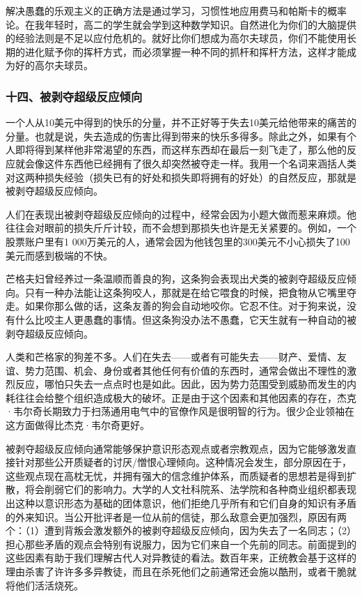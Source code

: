 解决愚蠢的乐观主义的正确方法是通过学习，习惯性地应用费马和帕斯卡的概率论。在我年轻时，高二的学生就会学到这种数学知识。自然进化为你们的大脑提供的经验法则是不足以应付危机的。就好比你们想成为高尔夫球员，你们不能使用长期的进化赋予你的挥杆方式，而必须掌握一种不同的抓杆和挥杆方法，这样才能成为好的高尔夫球员。
\par

\subsubsection*{十四、被剥夺超级反应倾向}

一个人从10美元中得到的快乐的分量，并不正好等于失去10美元给他带来的痛苦的分量。也就是说，失去造成的伤害比得到带来的快乐多得多。除此之外，如果有个人即将得到某样他非常渴望的东西，而这样东西却在最后一刻飞走了，那么他的反应就会像这件东西他已经拥有了很久却突然被夺走一样。我用一个名词来涵括人类对这两种损失经验（损失已有的好处和损失即将拥有的好处）的自然反应，那就是被剥夺超级反应倾向。
\par

人们在表现出被剥夺超级反应倾向的过程中，经常会因为小题大做而惹来麻烦。他往往会对眼前的损失斤斤计较，而不会想到那损失也许是无关紧要的。例如，一个股票账户里有1 000万美元的人，通常会因为他钱包里的300美元不小心损失了100美元而感到极端的不快。
\par

芒格夫妇曾经养过一条温顺而善良的狗，这条狗会表现出犬类的被剥夺超级反应倾向。只有一种办法能让这条狗咬人，那就是在给它喂食的时候，把食物从它嘴里夺走。如果你那么做的话，这条友善的狗会自动地咬你。它忍不住。对于狗来说，没有什么比咬主人更愚蠢的事情。但这条狗没办法不愚蠢，它天生就有一种自动的被剥夺超级反应倾向。
\par

人类和芒格家的狗差不多。人们在失去——或者有可能失去——财产、爱情、友谊、势力范围、机会、身份或者其他任何有价值的东西时，通常会做出不理性的激烈反应，哪怕只失去一点点时也是如此。因此，因为势力范围受到威胁而发生的内耗往往会给整个组织造成极大的破坏。正是由于这个因素和其他因素的存在，杰克·韦尔奇长期致力于扫荡通用电气中的官僚作风是很明智的行为。很少企业领袖在这方面做得比杰克·韦尔奇更好。
\par

被剥夺超级反应倾向通常能够保护意识形态观点或者宗教观点，因为它能够激发直接针对那些公开质疑者的讨厌/憎恨心理倾向。这种情况会发生，部分原因在于，这些观点现在高枕无忧，并拥有强大的信念维护体系，而质疑者的思想若是得到扩散，将会削弱它们的影响力。大学的人文社科院系、法学院和各种商业组织都表现出这种以意识形态为基础的团体意识，他们拒绝几乎所有和它们自身的知识有矛盾的外来知识。当公开批评者是一位从前的信徒，那么敌意会更加强烈，原因有两个：（1）遭到背叛会激发额外的被剥夺超级反应倾向，因为失去了一名同志；（2）担心那些矛盾的观点会特别有说服力，因为它们来自一个先前的同志。前面提到的这些因素有助于我们理解古代人对异教徒的看法。数百年来，正统教会基于这样的理由杀害了许许多多异教徒，而且在杀死他们之前通常还会施以酷刑，或者干脆就将他们活活烧死。
\par

